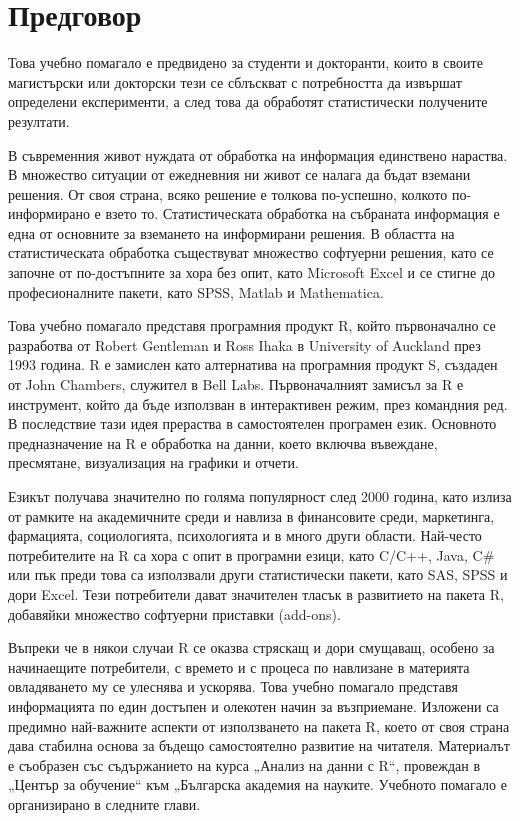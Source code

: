 \newpage
{}
\chapter*{Предговор}
\setcounter{page}{1}
\pagestyle{fancyplain}

Това учебно помагало е предвидено за студенти и докторанти, които в своите магистърски или докторски тези се сблъскват с потребността да извършат определени експерименти, а след това да обработят статистически получените резултати. 

В съвременния живот нуждата от обработка на информация единствено нараства. В множество ситуации от ежедневния ни живот се налага да бъдат вземани решения. От своя страна, всяко решение е толкова по-успешно, колкото по-информирано е взето то. Статистическата обработка на събраната информация е една от основните за вземането на информирани решения. В областта на статистическата обработка съществуват множество софтуерни решения, като се започне от по-достъпните за хора без опит, като Microsoft Excel и се стигне до професионалните пакети, като SPSS, Matlab и Mathematica. 

Това учебно помагало представя програмния продукт R, който първоначално се разработва от Robert Gentleman и Ross Ihaka в University of Auckland през 1993 година. R е замислен като алтернатива на програмния продукт S, създаден от John Chambers, служител в Bell Labs. Първоначалният замисъл за R е инструмент, който да бъде използван в интерактивен режим, през командния ред. В последствие тази идея прераства в самостоятелен програмен език. Основното предназначение на R е обработка на данни, което включва въвеждане, пресмятане, визуализация на графики и отчети. 

Езикът получава значително по голяма популярност след 2000 година, като излиза от рамките на академичните среди и навлиза в финансовите среди, маркетинга, фармацията, социологията, психологията и в много други области. Най-често потребителите на R са хора с опит в програмни езици, като C/C++, Java, C\# или пък преди това са използвали други статистически пакети, като SAS, SPSS и дори Excel. Тези потребители дават значителен тласък в развитието на пакета R, добавяйки множество софтуерни приставки (add-ons). 

Въпреки че в някои случаи R се оказва стряскащ и дори смущаващ, особено за начинаещите потребители, с времето и с процеса по навлизане в материята овладяването му се улеснява и ускорява. Това учебно помагало представя информацията по един достъпен и олекотен начин за възприемане. Изложени са предимно най-важните аспекти от използването на пакета R, което от своя страна дава стабилна основа за бъдещо самостоятелно развитие на читателя. Материалът е съобразен със съдържанието на курса „Анализ на данни с R“, провеждан в „Център за обучение“ към „Българска академия на науките. Учебното помагало е организирано в следните глави.

